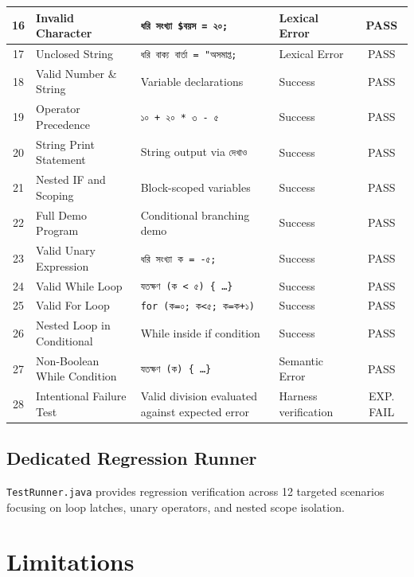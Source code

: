 \documentclass[12pt, a4paper]{report}
\begin{document}
\begin{longtable}{|c|>{\raggedright\arraybackslash}p{2.8cm}|>{\raggedright\arraybackslash}p{3.8cm}|>{\raggedright\arraybackslash}p{3.8cm}|c|}
\hline
16 & Invalid Character & \texttt{ধরি সংখ্যা \$বয়স = ২০;} & Lexical Error & PASS \\
\hline
17 & Unclosed String & \texttt{ধরি বাক্য বার্তা = "অসমাপ্ত;} & Lexical Error & PASS \\
\hline
18 & Valid Number \& String & Variable declarations & Success & PASS \\
\hline
19 & Operator Precedence & \texttt{১০ + ২০ * ৩ - ৫} & Success & PASS \\
\hline
20 & String Print Statement & String output via \texttt{দেখাও} & Success & PASS \\
\hline
21 & Nested IF and Scoping & Block-scoped variables & Success & PASS \\
\hline
22 & Full Demo Program & Conditional branching demo & Success & PASS \\
\hline
23 & Valid Unary Expression & \texttt{ধরি সংখ্যা ক = -৫;} & Success & PASS \\
\hline
24 & Valid While Loop & \texttt{যতক্ষণ (ক < ৫) \{ \dots \}} & Success & PASS \\
\hline
25 & Valid For Loop & \texttt{for (ক=০; ক<৫; ক=ক+১)} & Success & PASS \\
\hline
26 & Nested Loop in Conditional & While inside if condition & Success & PASS \\
\hline
27 & Non-Boolean While Condition & \texttt{যতক্ষণ (ক) \{ \dots \}} & Semantic Error & PASS \\
\hline
28 & Intentional Failure Test & Valid division evaluated against expected error & Harness verification & EXP. FAIL \\
\hline
\end{longtable}

\section{Dedicated Regression Runner}
\texttt{TestRunner.java} provides regression verification across 12 targeted scenarios focusing on loop latches, unary operators, and nested scope isolation.

\chapter{Limitations}
\end{document}
